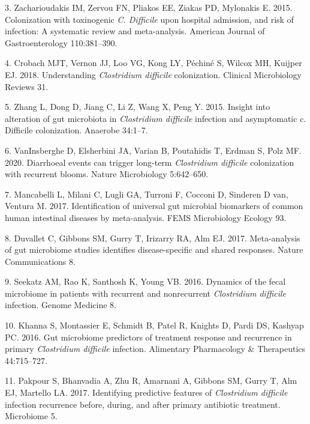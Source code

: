 \documentclass[
  11pt,
]{article}
\begin{document}
\leavevmode\hypertarget{ref-Zacharioudakis2015}{}%
3. Zacharioudakis IM, Zervou FN, Pliakos EE, Ziakas PD, Mylonakis E.
2015. Colonization with toxinogenic \emph{C. Difficile} upon hospital
admission, and risk of infection: A systematic review and meta-analysis.
American Journal of Gastroenterology 110:381--390.

\leavevmode\hypertarget{ref-Crobach2018}{}%
4. Crobach MJT, Vernon JJ, Loo VG, Kong LY, Péchiné S, Wilcox MH,
Kuijper EJ. 2018. Understanding \emph{Clostridium difficile}
colonization. Clinical Microbiology Reviews 31.

\leavevmode\hypertarget{ref-Zhang2015}{}%
5. Zhang L, Dong D, Jiang C, Li Z, Wang X, Peng Y. 2015. Insight into
alteration of gut microbiota in \emph{Clostridium difficile} infection
and asymptomatic c. Difficile colonization. Anaerobe 34:1--7.

\leavevmode\hypertarget{ref-VanInsberghe2020}{}%
6. VanInsberghe D, Elsherbini JA, Varian B, Poutahidis T, Erdman S, Polz
MF. 2020. Diarrhoeal events can trigger long-term \emph{Clostridium
difficile} colonization with recurrent blooms. Nature Microbiology
5:642--650.

\leavevmode\hypertarget{ref-Mancabelli2017}{}%
7. Mancabelli L, Milani C, Lugli GA, Turroni F, Cocconi D, Sinderen D
van, Ventura M. 2017. Identification of universal gut microbial
biomarkers of common human intestinal diseases by meta-analysis. FEMS
Microbiology Ecology 93.

\leavevmode\hypertarget{ref-Duvallet2017}{}%
8. Duvallet C, Gibbons SM, Gurry T, Irizarry RA, Alm EJ. 2017.
Meta-analysis of gut microbiome studies identifies disease-specific and
shared responses. Nature Communications 8.

\leavevmode\hypertarget{ref-Seekatz2016}{}%
9. Seekatz AM, Rao K, Santhosh K, Young VB. 2016. Dynamics of the fecal
microbiome in patients with recurrent and nonrecurrent \emph{Clostridium
difficile} infection. Genome Medicine 8.

\leavevmode\hypertarget{ref-Khanna2016}{}%
10. Khanna S, Montassier E, Schmidt B, Patel R, Knights D, Pardi DS,
Kashyap PC. 2016. Gut microbiome predictors of treatment response and
recurrence in primary \emph{Clostridium difficile} infection. Alimentary
Pharmacology \& Therapeutics 44:715--727.

\leavevmode\hypertarget{ref-Pakpour2017}{}%
11. Pakpour S, Bhanvadia A, Zhu R, Amarnani A, Gibbons SM, Gurry T, Alm
EJ, Martello LA. 2017. Identifying predictive features of
\emph{Clostridium difficile} infection recurrence before, during, and
after primary antibiotic treatment. Microbiome 5.
\end{document}
